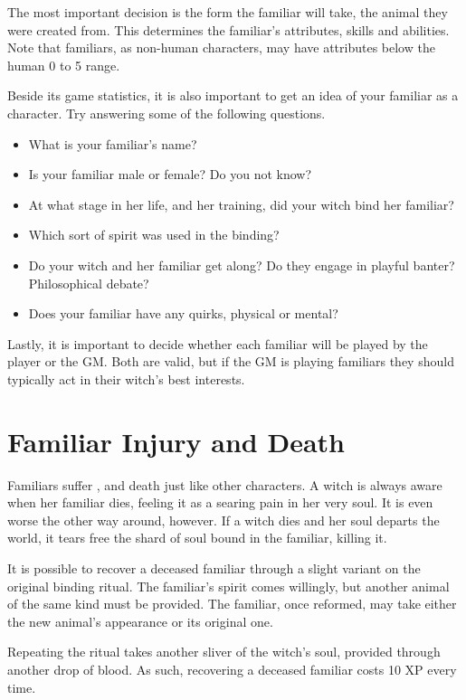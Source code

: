 The most important decision is the form the familiar will take, the animal they were created from.
This determines the familiar's attributes, skills and abilities.
Note that familiars, as non-human characters, may have attributes below the human 0 to 5 range.

Beside its game statistics, it is also important to get an idea of your familiar as a character.
Try answering some of the following questions.

\begin{itemize}
	\item What is your familiar's name?
	\item Is your familiar male or female?
		Do you not know?
	\item At what stage in her life, and her training, did your witch bind her familiar?
	\item Which sort of spirit was used in the binding? %
	\item Do your witch and her familiar get along?
		Do they engage in playful banter?
		Philosophical debate?
	\item Does your familiar have any quirks, physical or mental?
\end{itemize}

Lastly, it is important to decide whether each familiar will be played by the player or the GM.
Both are valid, but if the GM is playing familiars they should typically act in their witch's best interests.

\section{Familiar Injury and Death}

Familiars suffer {\damage}, {\shock} and death just like other characters.
A witch is always aware when her familiar dies, feeling it as a searing pain in her very soul.
It is even worse the other way around, however.
If a witch dies and her soul departs the world, it tears free the shard of soul bound in the familiar, killing it.

It is possible to recover a deceased familiar through a slight variant on the original binding ritual.
The familiar's spirit comes willingly, but another animal of the same kind must be provided.
The familiar, once reformed, may take either the new animal's appearance or its original one.

Repeating the ritual takes another sliver of the witch's soul, provided through another drop of blood.
As such, recovering a deceased familiar costs 10 XP every time.

